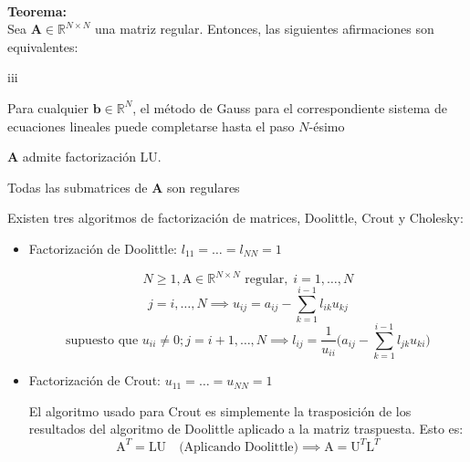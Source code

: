 \documentclass{article}
\begin{document}
\hrulefill
\\
\textbf{Teorema:}
\\
Sea $\textbf{A}\in\mathbb{R}^{N\times N}$ una matriz regular. Entonces, las siguientes afirmaciones son equivalentes:
\begin{labeling}{iii}
\item [(i)] Para cualquier $\textbf{b}\in\mathbb{R}^N$, el método de Gauss para el correspondiente sistema de ecuaciones lineales puede completarse hasta el paso $N$-ésimo
\item [(ii)] \textbf{A} admite factorización LU.
\item [(iii)] Todas las submatrices de \textbf{A} son regulares
\end{labeling}
Existen tres algoritmos de factorización de matrices, Doolittle, Crout y Cholesky:
\begin{itemize}
\item Factorización de Doolittle: $l_{11}=\dots=l_{NN}=1$

$$N\geq 1,\text{A}\in\mathbb{R}^{N\times N}\text{ regular},\;i=1,\dots,N$$
$$j=i,\dots,N\implies u_{ij}=a_{ij}-\sum_{k=1}^{i-1}l_{ik}u_{kj}$$
$$\text{supuesto que }u_{ii}\neq 0; j=i+1,\dots,N\implies l_{ij}=\frac{1}{u_{ii}}\bigg(a_{ij}-\sum_{k=1}^{i-1}l_{jk}u_{ki}\bigg)$$

\item Factorización de Crout: $u_{11}=\dots=u_{NN}=1$

El algoritmo usado para Crout es simplemente la trasposición de los resultados del algoritmo de Doolittle aplicado a la matriz traspuesta. Esto es:
$$\text{A}^T=\text{LU}\quad\text{(Aplicando Doolittle)}\implies\text{A}=\text{U}^T\text{L}^T$$
\end{itemize}

\hrulefill
\end{document}
